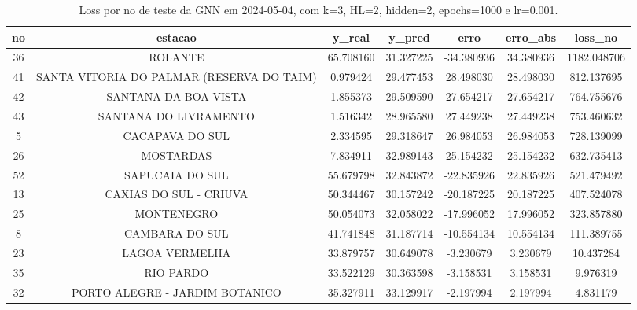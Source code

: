 \begin{table}[h]
\centering
\caption{Loss por no de teste da GNN em 2024-05-04, com k=3, HL=2, hidden=2, epochs=1000 e lr=0.001.}
\label{tab:gnn_loss_k3_hl2_h2_e1000_d20240504}
\begin{tabular}{ccccccc}
\toprule
no & estacao & y\_real & y\_pred & erro & erro\_abs & loss\_no \\
\midrule
36 & ROLANTE & 65.708160 & 31.327225 & -34.380936 & 34.380936 & 1182.048706 \\
41 & SANTA VITORIA DO PALMAR (RESERVA DO TAIM) & 0.979424 & 29.477453 & 28.498030 & 28.498030 & 812.137695 \\
42 & SANTANA DA BOA VISTA & 1.855373 & 29.509590 & 27.654217 & 27.654217 & 764.755676 \\
43 & SANTANA DO LIVRAMENTO & 1.516342 & 28.965580 & 27.449238 & 27.449238 & 753.460632 \\
5 & CACAPAVA DO SUL & 2.334595 & 29.318647 & 26.984053 & 26.984053 & 728.139099 \\
26 & MOSTARDAS & 7.834911 & 32.989143 & 25.154232 & 25.154232 & 632.735413 \\
52 & SAPUCAIA DO SUL & 55.679798 & 32.843872 & -22.835926 & 22.835926 & 521.479492 \\
13 & CAXIAS DO SUL - CRIUVA & 50.344467 & 30.157242 & -20.187225 & 20.187225 & 407.524078 \\
25 & MONTENEGRO & 50.054073 & 32.058022 & -17.996052 & 17.996052 & 323.857880 \\
8 & CAMBARA DO SUL & 41.741848 & 31.187714 & -10.554134 & 10.554134 & 111.389755 \\
23 & LAGOA VERMELHA & 33.879757 & 30.649078 & -3.230679 & 3.230679 & 10.437284 \\
35 & RIO PARDO & 33.522129 & 30.363598 & -3.158531 & 3.158531 & 9.976319 \\
32 & PORTO ALEGRE - JARDIM BOTANICO & 35.327911 & 33.129917 & -2.197994 & 2.197994 & 4.831179 \\
\bottomrule
\end{tabular}
\end{table}
